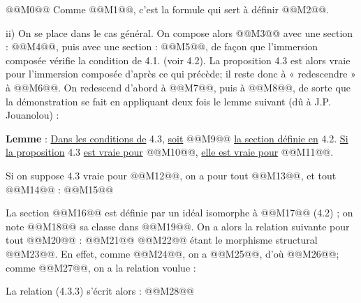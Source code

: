 
@@M0@@
Comme @@M1@@, c'est la formule qui sert à définir @@M2@@.

ii) On se place dans le cas général. On compose alors @@M3@@ avec une section : @@M4@@, puis avec une section : @@M5@@, de façon que l'immersion composée vérifie la condition de 4.1. (voir 4.2). La proposition 4.3 est alors vraie pour l'immersion composée d'après ce qui précède; il reste donc à « redescendre » à @@M6@@. On redescend d'abord à @@M7@@, puis à @@M8@@, de sorte que la démonstration se fait en appliquant deux fois le lemme suivant (dû à J.P. Jouanolou) :

\textbf{Lemme} : \uline{Dans les conditions de} 4.3, \uline{soit} @@M9@@ \uline{la section définie en} 4.2. \uline{Si la proposition} 4.3 \uline{est vraie pour} @@M10@@, \uline{elle est vraie pour} @@M11@@.

Si on suppose 4.3 vraie pour @@M12@@, on a pour tout @@M13@@, et tout @@M14@@ :
@@M15@@

La section @@M16@@ est définie par un idéal isomorphe à @@M17@@ (4.2) ; on note @@M18@@ sa classe dans @@M19@@. On a alors la relation suivante pour tout @@M20@@ :
@@M21@@
@@M22@@ étant le morphisme structural @@M23@@. En effet, comme @@M24@@, on a @@M25@@, d'où @@M26@@; comme @@M27@@, on a la relation voulue :

La relation (4.3.3) s'écrit alors :
@@M28@@
